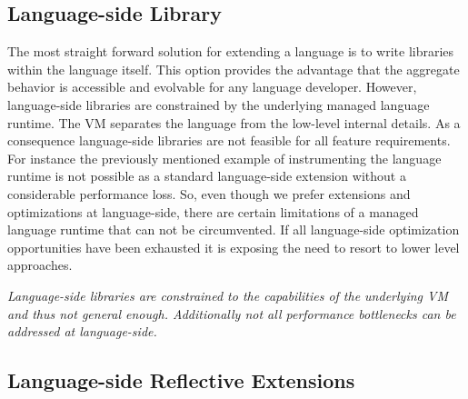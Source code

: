 \subsection{Language-side Library}

The most straight forward solution for extending a language is to write libraries within the language itself. 
This option provides the advantage that the aggregate behavior is accessible and evolvable for any language developer.
However, language-side libraries are constrained by the underlying managed language runtime.
The VM separates the language from the low-level internal details.
As a consequence language-side libraries are not feasible for all feature requirements.
For instance the previously mentioned example of instrumenting the language runtime is not possible as a standard language-side extension without a considerable performance loss.
So, even though we prefer extensions and optimizations at language-side, there are certain limitations of a managed language runtime that can not be circumvented.
If all language-side optimization opportunities have been exhausted it is exposing the need to resort to lower level approaches.

\noindent\emph{Language-side libraries are constrained to the capabilities of the underlying VM and thus not general enough. Additionally not all performance bottlenecks can be addressed at language-side.}

\subsection{Language-side Reflective Extensions}

